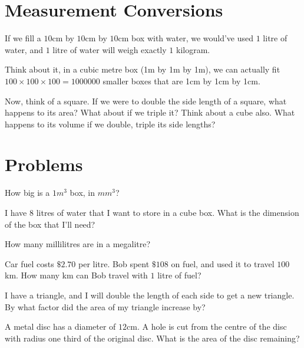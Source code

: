 \documentclass{article}
\theoremstyle{mytheoremstyle}
\theoremstyle{mytheoremstyle}
\theoremstyle{myproblemstyle}
\begin{document}
    \section{Measurement Conversions}

    \begin{theorem}
        If we fill a $10$cm by $10$cm by $10$cm box with water, we would've used $1$ litre of water, and $1$ litre of water will weigh exactly $1$ kilogram.
    \end{theorem}

    Think about it, in a cubic metre box (1m by 1m by 1m), we can actually fit $100 \times 100 \times 100 = 1000000$ smaller boxes that are 1cm by 1cm by 1cm. 
    
    Now, think of a square. If we were to double the side length of a square, what happens to its area? What about if we triple it? Think about a cube also. What happens to its volume if we double, triple its side lengths?

    \section{Problems}
    
    \begin{problem}
        How big is a $1m^3$ box, in $mm^3$?
    \end{problem}

    \begin{problem}
        I have $8$ litres of water that I want to store in a cube box. What is the dimension of the box that I'll need?
    \end{problem}

    \begin{problem}
        How many millilitres are in a megalitre?
    \end{problem}

    \begin{problem}
        Car fuel costs $\$2.70$ per litre. Bob spent $\$108$ on fuel, and used it to travel $100$km. How many km can Bob travel with $1$ litre of fuel?
    \end{problem}

    \begin{problem}
        I have a triangle, and I will double the length of each side to get a new triangle. By what factor did the area of my triangle increase by?
    \end{problem}

    \begin{problem}
        A metal disc has a diameter of $12$cm. A hole is cut from the centre of the disc with radius one third of the original disc. What is the area of the disc remaining?
    \end{problem}
\end{document}
